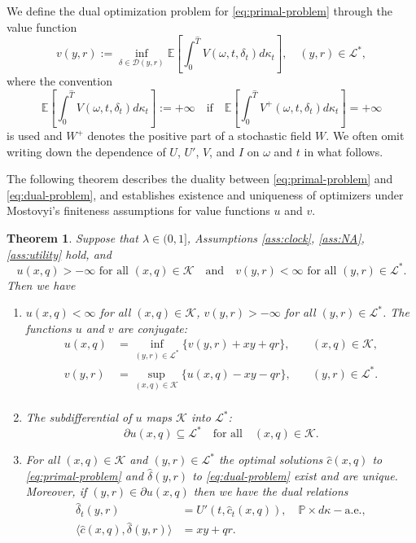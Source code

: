 \documentclass[11pt, oneside]{article}   	%
\theoremstyle{plain}
\newtheorem{thm}{Theorem}%
\theoremstyle{definition}
\theoremstyle{remark}
\begin{document}
We define the dual optimization problem for \eqref{eq:primal-problem} through the value function
\begin{equation}\label{eq:dual-problem}
v(y,r):=\inf_{\delta\in\mathcal{D}(y,r)}\mathbb{E}\left[\int_0^{\hat{T}} V(\omega,t,\delta_t)d\kappa_t\right],\quad(y,r)\in\mathcal{L}^*,
\end{equation}
where the convention
$$\mathbb{E}\left[\int_0^{\hat{T}} V(\omega,t,\delta_t)d\kappa_t\right]:=+\infty\quad\text{if}\quad\mathbb{E}\left[\int_0^{\hat{T}} V^+(\omega,t,\delta_t)d\kappa_t\right]=+\infty$$
is used and $W^{+}$ denotes the positive part of a stochastic field $W$. We often omit writing down the dependence of $U$, $U'$, $V$, and $I$ on $\omega$ and $t$ in what follows.


The following theorem describes the duality between \eqref{eq:primal-problem} and \eqref{eq:dual-problem}, and establishes existence and uniqueness of optimizers under Mostovyi's finiteness assumptions for value functions $u$ and $v$.
\begin{thm}\label{thm:main-duality}
Suppose that $\lambda\in(0,1]$, Assumptions \ref{ass:clock}, \ref{ass:NA}, \ref{ass:utility} hold, and
$$u(x,q)>-\infty\text{  for all  }(x,q)\in\mathcal{K}\quad \text{and}\quad v(y,r)<\infty\text{  for all  }(y,r)\in\mathcal{L}^*.$$
Then we have
\begin{enumerate}
\item $u(x,q)<\infty$ for all $(x,q)\in\mathcal{K}$, $v(y,r)>-\infty$ for all $(y,r)\in\mathcal{L}^*$. The functions $u$ and $v$ are conjugate:
\begin{equation}\label{eq:conjugacy-rel}
\begin{aligned}
u(x,q)&=\inf_{(y,r)\in\mathcal{L}^*}\{v(y,r)+xy+qr\},&\quad (x,q)\in\mathcal{K},\\
v(y,r)&=\sup_{(x,q)\in\mathcal{K}}\{u(x,q)-xy-qr\},&\quad (y,r)\in\mathcal{L}^*.\\
\end{aligned}
\end{equation}
\item The subdifferential of $u$ maps $\mathcal{K}$ into $\mathcal{L}^*$:
$$\partial u(x,q)\subseteq\mathcal{L}^*\quad \text{for all}\quad(x,q)\in\mathcal{K}.$$
\item For all $(x,q)\in\mathcal{K}$ and $(y,r)\in\mathcal{L}^*$ the optimal solutions $\hat{c}(x,q)$ to \eqref{eq:primal-problem} and $\hat{\delta}(y,r)$ to \eqref{eq:dual-problem} exist and are unique. Moreover, if $(y,r)\in\partial u(x,q)$ then we have the dual relations
\begin{equation}\label{eq:dual-relations-thm}
\begin{aligned}
\hat{\delta}_t(y,r)&=U'(t,\hat{c}_t(x,q)),\quad \mathbb{P}\times d\kappa-\text{a.e.},\\
\langle\hat{c}(x,q),\hat{\delta}(y,r)\rangle&=xy+qr.
\end{aligned}
\end{equation}
\end{enumerate}
\end{thm}
\end{document}
